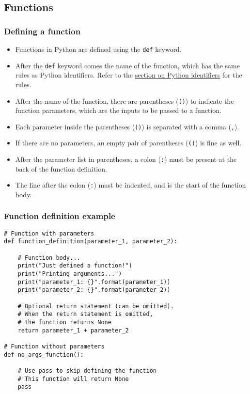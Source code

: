 \documentclass[11pt]{article}
\begin{document}
\subsection{Functions}
\label{sec:orgf324d27}

\subsubsection{Defining a function}
\label{sec:orgcf158ce}
\begin{itemize}
\item Functions in Python are defined using the \texttt{def} keyword.
\item After the \texttt{def} keyword comes the name of the function, which has the same rules as Python identifiers. Refer to the \hyperref[orgffff835]{section on Python identifiers} for the rules.
\item After the name of the function, there are parentheses (\texttt{()}) to indicate the function parameters, which are the inputs to be passed to a function.
\item Each parameter inside the parentheses (\texttt{()}) is separated with a comma (\texttt{,}).
\item If there are no parameters, an empty pair of parentheses (\texttt{()}) is fine as well.
\item After the parameter list in parentheses, a colon (\texttt{:}) must be present at the back of the function definition.
\item The line after the colon (\texttt{:}) must be indented, and is the start of the function body.
\end{itemize}
\subsubsection{Function definition example}
\label{sec:org16c08d7}
\begin{verbatim}
# Function with parameters
def function_definition(parameter_1, parameter_2):

    # Function body...
    print("Just defined a function!")
    print("Printing arguments...")
    print("parameter_1: {}".format(parameter_1))
    print("parameter_2: {}".format(parameter_2))

    # Optional return statement (can be omitted).
    # When the return statement is omitted,
    # the function returns None
    return parameter_1 + parameter_2

# Function without parameters
def no_args_function():

    # Use pass to skip defining the function
    # This function will return None
    pass
\end{verbatim}
\end{document}
